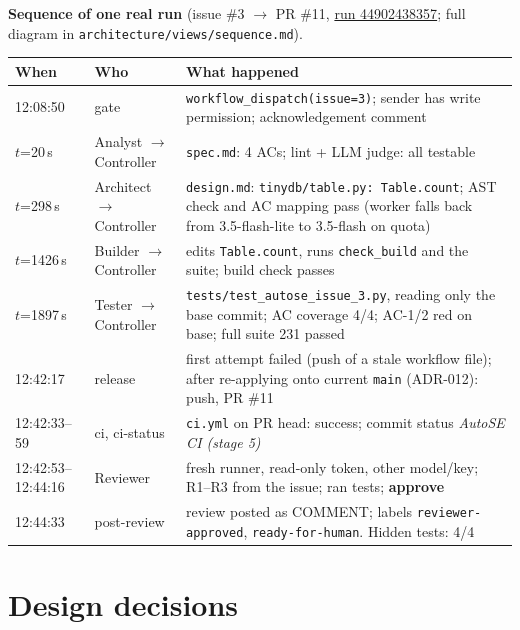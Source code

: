 \documentclass[10pt,a4paper]{article}
\newcommand{\code}[1]{\texttt{#1}}
\begin{document}
\textbf{Sequence of one real run} (issue \#3 $\to$ PR \#11, \href{https://github.com/Ohshit-ak/tinydb/actions/runs/44902438357}{run 44902438357}; full diagram in \code{architecture/views/sequence.md}).
\begin{table}[H]\centering\scriptsize
\begin{tabularx}{\linewidth}{@{}l l X@{}}
\toprule
When & Who & What happened\\
\midrule
12:08:50 & gate & \code{workflow\_dispatch(issue=3)}; sender has write permission; acknowledgement comment\\
$t$=20\,s & Analyst $\to$ Controller & \code{spec.md}: 4 ACs; lint + LLM judge: all testable\\
$t$=298\,s & Architect $\to$ Controller & \code{design.md}: \code{tinydb/table.py: Table.count}; AST check and AC mapping pass (worker falls back from 3.5-flash-lite to 3.5-flash on quota)\\
$t$=1426\,s & Builder $\to$ Controller & edits \code{Table.count}, runs \code{check\_build} and the suite; build check passes\\
$t$=1897\,s & Tester $\to$ Controller & \code{tests/test\_autose\_issue\_3.py}, reading only the base commit; AC coverage 4/4; AC-1/2 red on base; full suite 231 passed\\
12:42:17 & release & first attempt failed (push of a stale workflow file); after re-applying onto current \code{main} (ADR-012): push, PR \#11\\
12:42:33--59 & ci, ci-status & \code{ci.yml} on PR head: success; commit status \emph{AutoSE CI (stage 5)}\\
12:42:53--12:44:16 & Reviewer & fresh runner, read-only token, other model/key; R1--R3 from the issue; ran tests; \textbf{approve}\\
12:44:33 & post-review & review posted as COMMENT; labels \code{reviewer-approved}, \code{ready-for-human}. Hidden tests: 4/4\\
\bottomrule
\end{tabularx}
\end{table}

\section{Design decisions}
\end{document}
